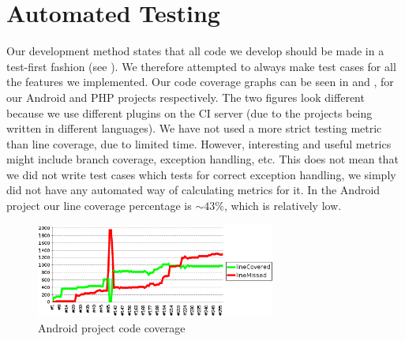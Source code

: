
\section{Automated Testing}
\label{sec:automated_unit_test}


Our development method states that all code we develop should be made in a test-first fashion (see ). We therefore attempted to always make test cases for all the features we implemented. Our code coverage graphs can be seen in  and , for our Android and PHP projects respectively. The two figures look different because we use different plugins on the CI server (due to the projects being written in different languages). We have not used a more strict testing metric than line coverage, due to limited time. However, interesting and useful metrics might include branch coverage, exception handling, etc. This does not mean that we did not write test cases which tests for correct exception handling, we simply did not have any automated way of calculating metrics for it. In the Android project our line coverage percentage is $\sim 43\%$, which is relatively low. %


\begin{figure}[!htbp]
    \centering
    \includegraphics[width=0.7\textwidth]{graphic/quality_assurance/jenkins_android_code_coverage}
    \caption{Android project code coverage}
    \label{fig:android_project_code_coverage}
\end{figure}
\FloatBarrier

